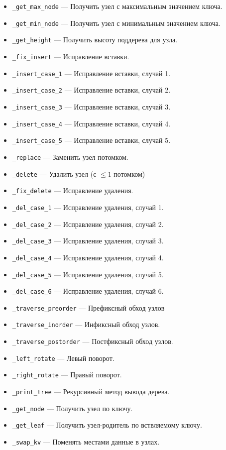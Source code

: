 \begin{itemize}
    \item \verb|_get_max_node| --- Получить узел с максимальным значением ключа.
    \item \verb|_get_min_node| --- Получить узел с минимальным значением ключа.
    \item \verb|_get_height| --- Получить высоту поддерева для узла.
    
    \item \verb|_fix_insert| --- Исправление вставки.
    \item \verb|_insert_case_1| --- Исправление вставки, случай 1.
    \item \verb|_insert_case_2| --- Исправление вставки, случай 2.
    \item \verb|_insert_case_3| --- Исправление вставки, случай 3.
    \item \verb|_insert_case_4| --- Исправление вставки, случай 4.
    \item \verb|_insert_case_5| --- Исправление вставки, случай 5.
    
    \item \verb|_replace| --- Заменить узел потомком.
    \item \verb|_delete| --- Удалить узел (с $ \le 1 $ потомком)
    
    \item \verb|_fix_delete| --- Исправление удаления.
    \item \verb|_del_case_1| --- Исправление удаления, случай 1.
    \item \verb|_del_case_2| --- Исправление удаления, случай 2.
    \item \verb|_del_case_3| --- Исправление удаления, случай 3.
    \item \verb|_del_case_4| --- Исправление удаления, случай 4.
    \item \verb|_del_case_5| --- Исправление удаления, случай 5.
    \item \verb|_del_case_6| --- Исправление удаления, случай 6.
    
    \item \verb|_traverse_preorder| --- Префиксный обход узлов
    \item \verb|_traverse_inorder| --- Инфиксный обход узлов.
    \item \verb|_traverse_postorder| --- Постфиксный обход узлов.
    
    \item \verb|_left_rotate| --- Левый поворот.
    \item \verb|_right_rotate| --- Правый поворот.
    
    \item \verb|_print_tree| --- Рекурсивный метод вывода дерева.
    \item \verb|_get_node| --- Получить узел по ключу.
    \item \verb|_get_leaf| --- Получить узел-родитель по вствляемому ключу.
    \item \verb|_swap_kv| --- Поменять местами данные в узлах.
\end{itemize}

